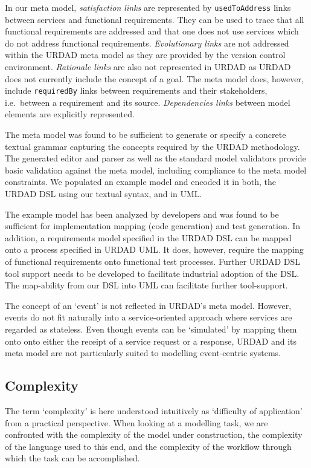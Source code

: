 In our meta model, \emph{satisfaction links} are represented by \verb+usedToAddress+ links between services and functional requirements. They can be used to trace that all functional requirements are addressed and that one does not use services which do not address functional requirements. \emph{Evolutionary links} are not addressed within the URDAD meta model as they are provided by the version control environment. \emph{Rationale links} are also not represented in URDAD as URDAD does not currently include the concept of a goal. The meta model does, however, include  \verb+requiredBy+ links between requirements and their stakeholders, i.e.\ between a requirement and its source. \emph{Dependencies links} between model elements are explicitly represented. 

The meta model was found to be sufficient to generate or specify a concrete textual grammar capturing the concepts required by the URDAD methodology. The generated editor and parser as well as the standard model validators provide basic validation against the meta model, including compliance to the meta model constraints. We populated an example model and encoded it in both, the URDAD DSL using our textual syntax, and in UML.

The example model has been analyzed by developers and was found to be sufficient for implementation mapping (code generation) and test generation. In addition, a requirements model specified in the URDAD DSL can be mapped onto a process specified in URDAD UML. It does, however, require the mapping of functional requirements onto functional test processes. Further URDAD DSL tool support needs to be developed to facilitate industrial adoption of the DSL. The map-ability from our DSL into UML can facilitate further tool-support.

The concept of an `event' is not reflected in URDAD's meta model. However, events do not fit naturally into a service-oriented approach where services are regarded as stateless. Even though events can be `simulated' by mapping them onto onto either the receipt of a service request or a response, URDAD and its meta model are not particularly suited to modelling event-centric systems.

\subsection{Complexity}
The term `complexity' is here understood intuitively as `difficulty of application' from a practical perspective. When looking at a modelling task, we are confronted with the complexity of the model under construction, the complexity of the language used to this end, and the complexity of the workflow through which the task can be accomplished.


